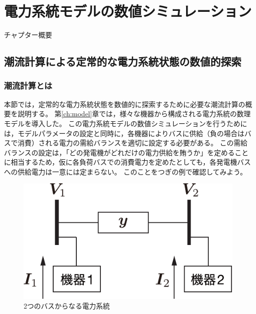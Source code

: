 \documentclass[tombow,dvipdfmx]{corona-a5}
\begin{document}
\chapter{電力系統モデルの数値シミュレーション}

チャプター概要

\section{潮流計算による定常的な電力系統状態の数値的探索}\label{sec:powflow}

\subsection{潮流計算とは}\label{sec:pfcal}

本節では，定常的な電力系統状態を数値的に探索するために必要な潮流計算の概要を説明する。
第\ref{ch:model}章では，様々な機器から構成される電力系統の数理モデルを導入した。
この電力系統モデルの数値シミュレーションを行うためには，モデルパラメータの設定と同時に，各機器によりバスに供給（負の場合はバスで消費）される電力の需給バランスを適切に設定する必要がある。
この需給バランスの設定は，「どの発電機がどれだけの電力供給を賄うか」を定めることに相当するため，仮に各負荷バスでの消費電力を定めたとしても，各発電機バスへの供給電力は一意には定まらない。
このことをつぎの例で確認してみよう。

\begin{例}[負荷バスでの消費電力を固定して発電機バスへの供給電力を求めた計算例]\label{ex:pflow}
\end{例}

\begin{figure}[t]
\centering
\includegraphics[width = .25\linewidth]{figs/2busex}
\caption{2つのバスからなる電力系統}
\label{fig:2buspf}
\end{figure}
\end{document}
